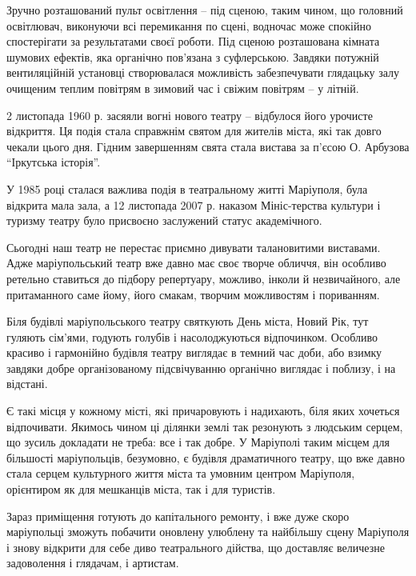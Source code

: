 Зручно розташований пульт освітлення – під сценою, таким чином, що головний
освітлювач, виконуючи всі перемикання по сцені, водночас може спокійно
спостерігати за результатами своєї роботи. Під сценою розташована кімната
шумових ефектів, яка органічно пов'язана з суфлерською. Завдяки потужній
вентиляційній установці створювалася можливість забезпечувати глядацьку залу
очищеним теплим повітрям в зимовий час і свіжим повітрям – у літній.


2 листопада 1960 р. засяяли вогні нового театру – відбулося його урочисте
відкриття. Ця подія стала справжнім святом для жителів міста, які так довго
чекали цього дня. Гідним завершенням свята стала вистава за п'єсою О. Арбузова
\enquote{Іркутська історія}.

У 1985 році сталася важлива подія в театральному житті Маріуполя, була відкрита
мала зала, а 12 листопада 2007 р. наказом Мініс\hyp{}терства культури і туризму
театру було присвоєно заслужений статус академічного.

Сьогодні наш театр не перестає приємно дивувати талановитими виставами. Адже
маріупольський театр вже давно має своє творче обличчя, він особливо ретельно
ставиться до підбору репертуару, можливо, інколи й незвичайного, але
притаманного саме йому, його смакам, творчим можливостям і пориванням.

Біля будівлі маріупольського театру святкують День міста, Новий Рік, тут
гуляють сім'ями, годують голубів і насолоджуються відпочинком. Особливо красиво
і гармонійно будівля театру виглядає в темний час доби, або взимку завдяки
добре організованому підсвічуванню органічно виглядає і поблизу, і на відстані.

Є такі місця у кожному місті, які причаровують і надихають, біля яких хочеться
відпочивати. Якимось чином ці ділянки землі так резонують з людським серцем, що
зусиль докладати не треба: все і так добре. У Маріуполі таким місцем для
більшості маріупольців, безумовно, є будівля драматичного театру, що вже давно
стала серцем культурного життя міста та умовним центром Маріуполя, орієнтиром
як для мешканців міста, так і для туристів.

Зараз приміщення готують до капітального ремонту, і вже дуже скоро маріупольці
зможуть побачити оновлену улюблену та найбільшу сцену Маріуполя і знову
відкрити для себе диво театрального дійства, що доставляє величезне задоволення
і глядачам, і артистам.


